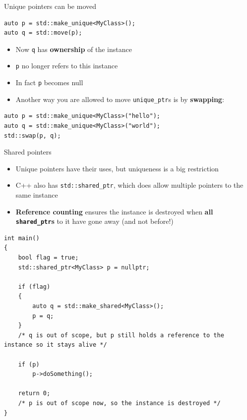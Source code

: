\begin{frame}[fragile]{Unique pointers can be moved}
    \begin{lstlisting}
auto p = std::make_unique<MyClass>();
auto q = std::move(p);
    \end{lstlisting} \pause
    \begin{itemize}
        \item Now \lstinline{q} has \textbf{ownership} of the instance \pause
        \item \lstinline{p} no longer refers to this instance \pause
        \item In fact \lstinline{p} becomes null \pause
        \item Another way you are allowed to move \lstinline{unique_ptr}s is by \textbf{swapping}:
    \end{itemize}
    \begin{lstlisting}
auto p = std::make_unique<MyClass>("hello");
auto q = std::make_unique<MyClass>("world");
std::swap(p, q);
    \end{lstlisting}
\end{frame}

\begin{frame}{Shared pointers}
    \begin{itemize}
        \item Unique pointers have their uses, but uniqueness is a big restriction \pause
        \item C++ also has \lstinline{std::shared_ptr}, which does allow multiple pointers to the same
            instance \pause
        \item \textbf{Reference counting} ensures the instance is destroyed when
            \textbf{all \lstinline{shared_ptr}s} to it have gone away (and not before!)
    \end{itemize}
\end{frame}

\begin{frame}[fragile]
    \begin{lstlisting}
int main()
{
	bool flag = true;
	std::shared_ptr<MyClass> p = nullptr;
	
	if (flag)
	{
		auto q = std::make_shared<MyClass>();
		p = q;
	}
    /* q is out of scope, but p still holds a reference to the instance so it stays alive */
    
    if (p)
        p->doSomething();
    
    return 0;
    /* p is out of scope now, so the instance is destroyed */
}
    \end{lstlisting}
\end{frame}

